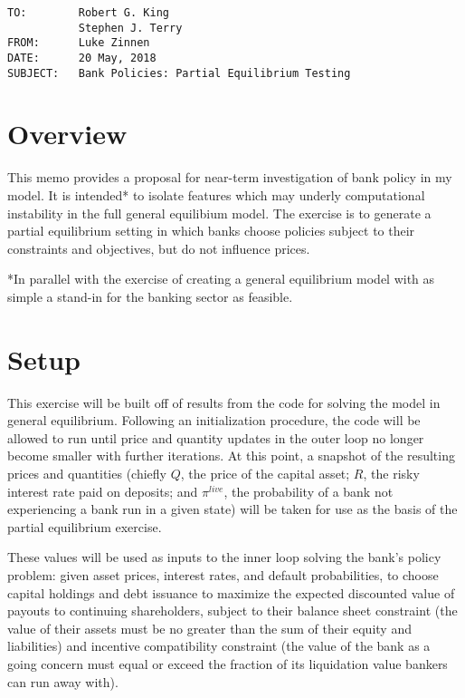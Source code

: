 \documentclass[english]{article}
\begin{document}
\begin{verbatim}
TO:        Robert G. King
           Stephen J. Terry
FROM:      Luke Zinnen
DATE:      20 May, 2018
SUBJECT:   Bank Policies: Partial Equilibrium Testing
\end{verbatim}

\section{Overview}

This memo provides a proposal for near-term investigation of bank policy in my model. It is intended* 
to isolate features which may underly computational instability in the full general equilibium model. 
The exercise is to generate a partial equilibrium setting in which banks choose policies subject to 
their constraints and objectives, but do not influence prices. 

 

*In parallel with the exercise of creating a general equilibrium model with as simple a stand-in for 
the banking sector as feasible.

\section{Setup}
This exercise will be built off of results from the code for solving the model in general equilibrium.
Following an initialization procedure, the code will be allowed to run until price and quantity updates 
in the outer loop no longer become smaller with further iterations. At this point, a snapshot of the 
resulting prices and quantities (chiefly $Q$, the price of the capital asset; $R$, the risky interest 
rate paid on deposits; and $\pi^{live}$, the probability of a bank not experiencing a bank run in a 
given state) will be taken for use as the basis of the partial equilibrium exercise. 

These values will be used as inputs to the inner loop solving the bank's policy problem: given asset 
prices, interest rates, and default probabilities, to choose capital holdings and debt issuance to 
maximize the expected discounted value of payouts to continuing shareholders, subject to their balance 
sheet constraint (the value of their assets must be no greater than the sum of their equity and liabilities) 
and incentive compatibility constraint (the value of the bank as a going concern must equal or exceed 
the fraction of its liquidation value bankers can run away with). 
\end{document}
